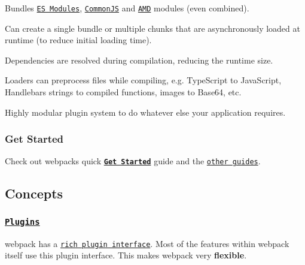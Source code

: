 \begin{DoxyItemize}
\item Bundles \href{http://www.2ality.com/2014/09/es6-modules-final.html}{\tt ES Modules}, \href{http://wiki.commonjs.org/}{\tt Common\+JS} and \href{https://github.com/amdjs/amdjs-api/wiki/AMD}{\tt A\+MD} modules (even combined).
\item Can create a single bundle or multiple chunks that are asynchronously loaded at runtime (to reduce initial loading time).
\item Dependencies are resolved during compilation, reducing the runtime size.
\item Loaders can preprocess files while compiling, e.\+g. Type\+Script to Java\+Script, Handlebars strings to compiled functions, images to Base64, etc.
\item Highly modular plugin system to do whatever else your application requires.
\end{DoxyItemize}

\subsubsection*{Get Started}

Check out webpack\textquotesingle{}s quick \href{https://webpack.js.org/get-started/}{\tt {\bfseries Get Started}} guide and the \href{https://webpack.js.org/guides/}{\tt other guides}.

\subsection*{Concepts}

\subsubsection*{\href{https://webpack.js.org/plugins/}{\tt Plugins}}

webpack has a \href{https://webpack.js.org/plugins/}{\tt rich plugin interface}. Most of the features within webpack itself use this plugin interface. This makes webpack very {\bfseries flexible}.

